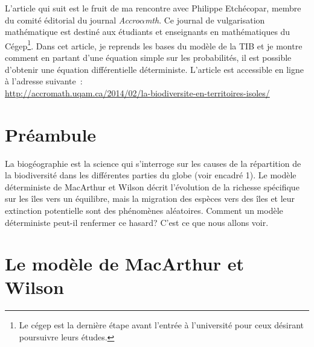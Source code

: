 \label{annI}
\addtocounter{chapter}{1}
\setcounter{equation}{0}


L'article qui suit est le fruit de ma rencontre avec Philippe Etchécopar,  membre du comité éditorial du journal \emph{Accro$\alpha$mth}.
Ce journal de vulgarisation mathématique est destiné aux étudiants et enseignants en mathématiques du Cégep\footnote{Le cégep est la dernière étape avant l'entrée à l'université pour ceux désirant poursuivre leurs études.}.
Dans cet article, je reprends les bases du modèle de la TIB et je montre comment en partant d'une équation simple sur les probabilités, il est possible d'obtenir une équation différentielle déterministe. L'article est accessible en ligne à l'adresse suivante~: \\ \url{http://accromath.uqam.ca/2014/02/la-biodiversite-en-territoires-isoles/}


\section{Préambule}
	La biogéographie est la science qui s’interroge sur les causes de la répartition de la biodiversité dans les différentes parties du globe (voir encadré 1). Le modèle déterministe de MacArthur et Wilson décrit l’évolution de la richesse spécifique sur les îles vers un équilibre, mais la migration des espèces vers des îles et leur extinction potentielle sont des phénomènes aléatoires. Comment un modèle déterministe peut-il renfermer ce hasard? C’est ce que nous allons voir.

\section{Le modèle de MacArthur et Wilson}

